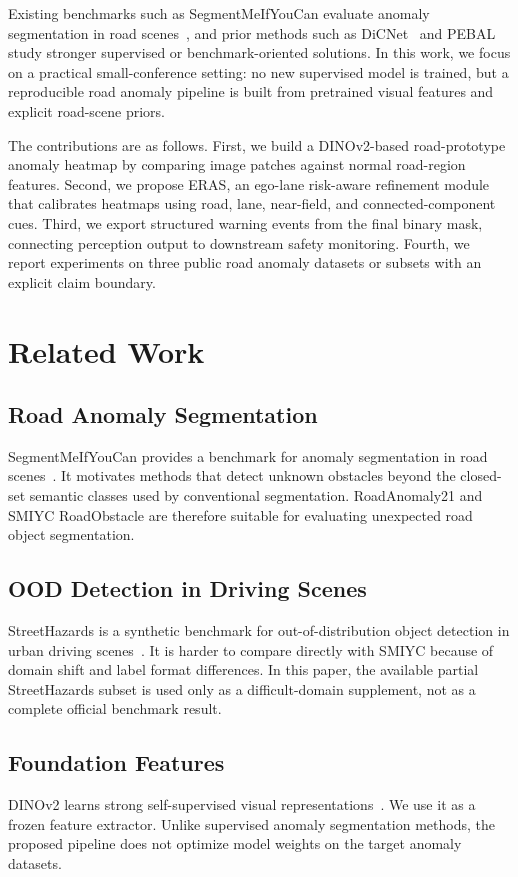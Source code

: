 \documentclass[runningheads]{llncs}
\begin{document}
Existing benchmarks such as SegmentMeIfYouCan evaluate anomaly segmentation in road scenes~\cite{chan2021segmentmeifyoucan}, and prior methods such as DiCNet~\cite{tian2022dicnet} and PEBAL~\cite{tian2022pebal} study stronger supervised or benchmark-oriented solutions. In this work, we focus on a practical small-conference setting: no new supervised model is trained, but a reproducible road anomaly pipeline is built from pretrained visual features and explicit road-scene priors.

The contributions are as follows. First, we build a DINOv2-based road-prototype anomaly heatmap by comparing image patches against normal road-region features. Second, we propose ERAS, an ego-lane risk-aware refinement module that calibrates heatmaps using road, lane, near-field, and connected-component cues. Third, we export structured warning events from the final binary mask, connecting perception output to downstream safety monitoring. Fourth, we report experiments on three public road anomaly datasets or subsets with an explicit claim boundary.

\section{Related Work}

\subsection{Road Anomaly Segmentation}
SegmentMeIfYouCan provides a benchmark for anomaly segmentation in road scenes~\cite{chan2021segmentmeifyoucan}. It motivates methods that detect unknown obstacles beyond the closed-set semantic classes used by conventional segmentation. RoadAnomaly21 and SMIYC RoadObstacle are therefore suitable for evaluating unexpected road object segmentation.

\subsection{OOD Detection in Driving Scenes}
StreetHazards is a synthetic benchmark for out-of-distribution object detection in urban driving scenes~\cite{hendrycks2019scaling}. It is harder to compare directly with SMIYC because of domain shift and label format differences. In this paper, the available partial StreetHazards subset is used only as a difficult-domain supplement, not as a complete official benchmark result.

\subsection{Foundation Features}
DINOv2 learns strong self-supervised visual representations~\cite{oquab2023dinov2}. We use it as a frozen feature extractor. Unlike supervised anomaly segmentation methods, the proposed pipeline does not optimize model weights on the target anomaly datasets.
\end{document}
